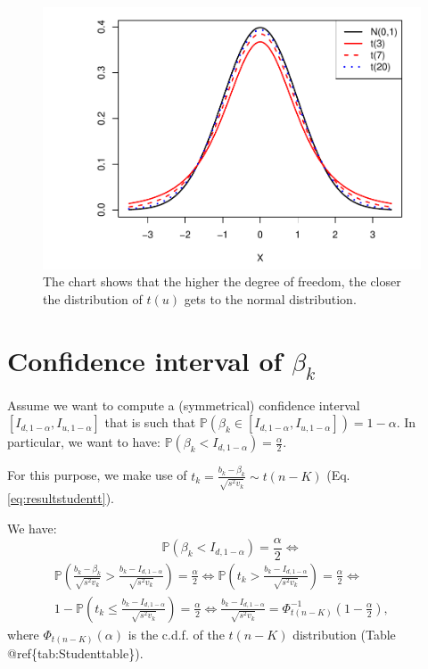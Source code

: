 \documentclass[
]{book}
\theoremstyle{definition}
\theoremstyle{definition}
\theoremstyle{definition}
\theoremstyle{definition}
\theoremstyle{remark}
\begin{document}
\begin{figure}
\centering
\includegraphics{bookdown-demo_files/figure-latex/chartStudent-1.pdf}
\caption{\label{fig:chartStudent}The chart shows that the higher the degree of freedom, the closer the distribution of \(t( u)\) gets to the normal distribution.}
\end{figure}

\hypertarget{confidence-interval-of-beta_k}{%
\section{\texorpdfstring{Confidence interval of \(\beta_k\)}{Confidence interval of \textbackslash beta\_k}}\label{confidence-interval-of-beta_k}}

Assume we want to compute a (symmetrical) confidence interval \([I_{d,1-\alpha},I_{u,1-\alpha}]\) that is such that \(\mathbb{P}(\beta_k \in [I_{d,1-\alpha},I_{u,1-\alpha}])=1-\alpha\). In particular, we want to have: \(\mathbb{P}(\beta_k < I_{d,1-\alpha})=\frac{\alpha}{2}\).

For this purpose, we make use of \(t_k = \frac{b_k - \beta_k}{\sqrt{s^2v_k}} \sim t(n-K)\) (Eq. \eqref{eq:resultstudentt}).

We have:
\[
\mathbb{P}(\beta_k < I_{d,1-\alpha})=\frac{\alpha}{2} \Leftrightarrow
\]
\begin{eqnarray*}
\mathbb{P}\left(\frac{b_k - \beta_k}{\sqrt{s^2v_k}} > \frac{b_k - I_{d,1-\alpha}}{\sqrt{s^2v_k}}\right)=\frac{\alpha}{2} \Leftrightarrow \mathbb{P}\left(t_k > \frac{b_k - I_{d,1-\alpha}}{\sqrt{s^2v_k}}\right)=\frac{\alpha}{2} \Leftrightarrow&&\\
1 - \mathbb{P}\left(t_k \le \frac{b_k - I_{d,1-\alpha}}{\sqrt{s^2v_k}}\right)=\frac{\alpha}{2} \Leftrightarrow \frac{b_k - I_{d,1-\alpha}}{\sqrt{s^2v_k}} = \Phi^{-1}_{t(n-K)}\left(1-\frac{\alpha}{2}\right),&&
\end{eqnarray*}
where \(\Phi_{t(n-K)}(\alpha)\) is the c.d.f. of the \(t(n-K)\) distribution (Table @ref\{tab:Studenttable\}).
\end{document}
